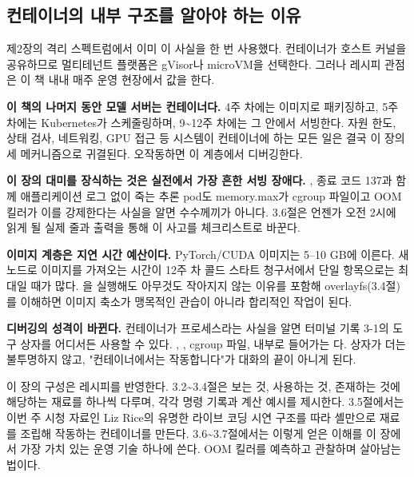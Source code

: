 \subsection*{컨테이너의 내부 구조를 알아야 하는 이유}

제2장의 격리 스펙트럼에서 이미 이 사실을 한 번 사용했다. 컨테이너가 호스트 커널을 공유하므로 멀티테넌트 플랫폼은 gVisor나 microVM을 선택한다. 그러나 레시피 관점은 이 책 내내 매주 운영 현장에서 값을 한다.

\begin{tbbitemize}
  \item \textbf{이 책의 나머지 동안 모델 서버는 컨테이너다.} 4주 차에는 이미지로 패키징하고, 5주 차에는 Kubernetes가 스케줄링하며, 9\textasciitilde{}12주 차에는 그 안에서 서빙한다. 자원 한도, 상태 검사, 네트워킹, GPU 접근 등 시스템이 컨테이너에 하는 모든 일은 결국 이 장의 세 메커니즘으로 귀결된다. 오작동하면 이 계층에서 디버깅한다.
  \item \textbf{이 장의 대미를 장식하는 것은 실전에서 가장 흔한 서빙 장애다.} , 종료 코드 137과 함께 애플리케이션 로그 없이 죽는 추론 pod도 memory.max가 cgroup 파일이고 OOM 킬러가 이를 강제한다는 사실을 알면 수수께끼가 아니다. 3.6절은 언젠가 오전 2시에 읽게 될 실제  줄과  출력을 통해 이 사고를 체크리스트로 바꾼다.
  \item \textbf{이미지 계층은 지연 시간 예산이다.} PyTorch/CUDA 이미지는 5–10 GB에 이른다. 새 노드로 이미지를 가져오는 시간이 12주 차 콜드 스타트 청구서에서 단일 항목으로는 최대일 때가 많다. 을 실행해도 아무것도 작아지지 않는 이유를 포함해 overlayfs(3.4절)를 이해하면 이미지 축소가 맹목적인 관습이 아니라 합리적인 작업이 된다.
  \item \textbf{디버깅의 성격이 바뀐다.} 컨테이너가 프로세스라는 사실을 알면 터미널 기록 3-1의 도구 상자를 어디서든 사용할 수 있다. , , cgroup 파일, 내부로 들어가는 다. 상자가 더는 불투명하지 않고, "컨테이너에서는 작동합니다"가 대화의 끝이 아니게 된다.
\end{tbbitemize}

이 장의 구성은 레시피를 반영한다. 3.2\textasciitilde{}3.4절은 보는 것, 사용하는 것, 존재하는 것에 해당하는 재료를 하나씩 다루며, 각각 명령 기록과 계산 예시를 제시한다. 3.5절에서는 이번 주 시청 자료인 Liz Rice의 유명한 라이브 코딩 시연 구조를 따라 셸만으로 재료를 조립해 작동하는 컨테이너를 만든다. 3.6\textasciitilde{}3.7절에서는 이렇게 얻은 이해를 이 장에서 가장 가치 있는 운영 기술 하나에 쓴다. OOM 킬러를 예측하고 관찰하며 살아남는 법이다.

